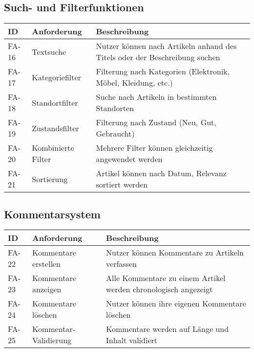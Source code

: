 \documentclass[a4paper,12pt]{article}
\begin{document}
\subsection{Such- und Filterfunktionen}
\begin{longtable}{|p{}|p{}|p{}|}
\hline
\textbf{ID} & \textbf{Anforderung} & \textbf{Beschreibung} \\
\hline
FA-16 & Textsuche & Nutzer können nach Artikeln anhand des Titels oder der Beschreibung suchen \\
\hline
FA-17 & Kategoriefilter & Filterung nach Kategorien (Elektronik, Möbel, Kleidung, etc.) \\
\hline
FA-18 & Standortfilter & Suche nach Artikeln in bestimmten Standorten \\
\hline
FA-19 & Zustandsfilter & Filterung nach Zustand (Neu, Gut, Gebraucht) \\
\hline
FA-20 & Kombinierte Filter & Mehrere Filter können gleichzeitig angewendet werden \\
\hline
FA-21 & Sortierung & Artikel können nach Datum, Relevanz sortiert werden \\
\hline
\end{longtable}

\subsection{Kommentarsystem}
\begin{longtable}{|p{}|p{}|p{}|}
\hline
\textbf{ID} & \textbf{Anforderung} & \textbf{Beschreibung} \\
\hline
FA-22 & Kommentare erstellen & Nutzer können Kommentare zu Artikeln verfassen \\
\hline
FA-23 & Kommentare anzeigen & Alle Kommentare zu einem Artikel werden chronologisch angezeigt \\
\hline
FA-24 & Kommentare löschen & Nutzer können ihre eigenen Kommentare löschen \\
\hline
FA-25 & Kommentar-Validierung & Kommentare werden auf Länge und Inhalt validiert \\
\hline
\end{longtable}
\end{document}
